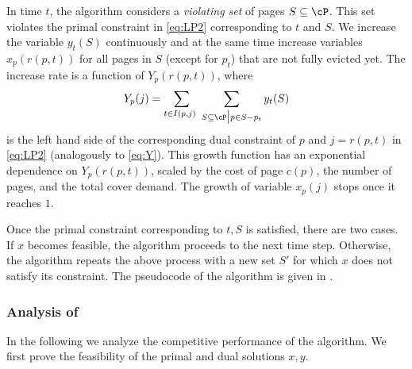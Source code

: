 In time $t$, the algorithm considers a {\em violating set} of pages $S \subseteq \cP$. This set violates the primal constraint in \eqref{eq:LP2} corresponding to $t$ and $S$. %
We increase the variable $y_{t}(S)$ continuously and at the same time increase variables $x_p(r(p,t))$ for all pages in $S$ (except for $p_t$) that are not fully evicted yet. The increase rate is a function of $Y_p(r(p,t))$, where %
\begin{equation}
	\label{eq:Y2}
	Y_p(j) =\sum_{t \in I(p,j)~} \sum_{S \subseteq \cP \big|p \in S-p_t} y_t(S)
\end{equation}  is the left hand side of the corresponding dual constraint of $p$ and $j = r(p,t)$ in \eqref{eq:LP2} (analogously to \eqref{eq:Y}). This growth function has an exponential dependence on $Y_p(r(p,t))$, scaled by the cost of page $c(p)$, the number of pages, and the total cover demand. The growth of variable $x_p(j)$ stops once it reaches $1$. %








Once the primal constraint corresponding to $t,S$ is satisfied, there are two cases. If $x$ becomes feasible, the algorithm proceeds to the next time step. Otherwise, the algorithm repeats the above process with a new set $S'$ for which $x$ does not satisfy its constraint. The pseudocode of the algorithm is given in . 


\subsubsection*{Analysis of }
In the following we analyze the competitive performance of the algorithm.  We first prove the feasibility of the primal and dual solutions $x,y$. %


